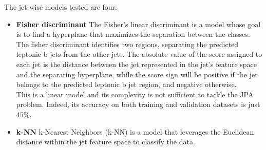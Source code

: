 \newpage
The jet-wise models tested are four: 
\begin{itemize}
    \item \textbf{Fisher discriminant} The Fisher's linear discriminant \ADDREF is a model whose goal is to find a hyperplane that maximizes the separation between the classes.\\
    The fisher discriminant identifies two regions, separating the predicted leptonic b jets from the other jets. The absolute value of the score assigned to each jet is the distance between the jet represented in the jet's feature space and the separating hyperplane, while the score sign will be positive if the jet belongs to the predicted leptonic b jet region, and negative otherwise.
    \\
    This is a linear model and its complexity is not sufficient to tackle the JPA problem. Indeed, its accuracy on both training and validation datasets is just $45\%$.
    \item \textbf{k-NN}
    k-Nearest Neighbors (k-NN) \ADDREF is a model that leverages the Euclidean distance within the jet feature space to classify the data.
    

\end{itemize}
